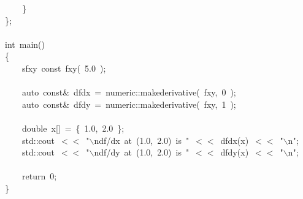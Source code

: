 \documentclass[9pt,onside,a4paper]{article}
\newcommand{\hlstd}[1]{\textcolor[rgb]{0.2,0,0.4}{#1}}
\newcommand{\hlnum}[1]{\textcolor[rgb]{0.2,0.73,0.02}{#1}}
\newcommand{\hlesc}[1]{\textcolor[rgb]{0.65,0.09,0.38}{#1}}
\newcommand{\hlstr}[1]{\textcolor[rgb]{0.09,0.38,0.65}{#1}}
\newcommand{\hlopt}[1]{\textcolor[rgb]{0.33,0.33,0.33}{#1}}
\newcommand{\hlkwa}[1]{\textcolor[rgb]{1,0.19,0.19}{#1}}
\newcommand{\hlkwb}[1]{\textcolor[rgb]{0.96,0.55,0.14}{#1}}
\newcommand{\hlkwc}[1]{\textcolor[rgb]{0,0,1}{#1}}
\newcommand{\hlkwd}[1]{\textcolor[rgb]{0.82,0.11,0.93}{#1}}
\begin{document}
{\hlstd{}\hlstd{\ \ \ \ }\hlstd{}\hlopt{\}}\hspace*{\fill}\\
\hlstd{}\hlopt{\};}\hspace*{\fill}\\
\hlstd{}\hspace*{\fill}\\
\hlkwb{int\ }\hlstd{}\hlkwd{main}\hlstd{}\hlopt{()}\hspace*{\fill}\\
\hlstd{}\hlopt{\{}\hspace*{\fill}\\
\hlstd{}\hlstd{\ \ \ \ }\hlstd{sfxy\ }\hlkwb{const\ }\hlstd{}\hlkwd{fxy}\hlstd{}\hlopt{(\ }\hlstd{}\hlnum{5.0\ }\hlstd{}\hlopt{);}\hspace*{\fill}\\
\hlstd{\hspace*{\fill}\\
}\hlstd{\ \ \ \ }\hlstd{}\hlkwc{auto\ }\hlstd{}\hlkwb{const}\hlstd{}\hlopt{\&\ }\hlstd{dfdx\ }\hlopt{=\ }\hlstd{numeric}\hlopt{::}\hlstd{}\hlkwd{make\textunderscore derivative}\hlstd{}\hlopt{(\ }\hlstd{fxy}\hlopt{,\ }\hlstd{}\hlnum{0\ }\hlstd{}\hlopt{);}\hspace*{\fill}\\
\hlstd{}\hlstd{\ \ \ \ }\hlstd{}\hlkwc{auto\ }\hlstd{}\hlkwb{const}\hlstd{}\hlopt{\&\ }\hlstd{dfdy\ }\hlopt{=\ }\hlstd{numeric}\hlopt{::}\hlstd{}\hlkwd{make\textunderscore derivative}\hlstd{}\hlopt{(\ }\hlstd{fxy}\hlopt{,\ }\hlstd{}\hlnum{1\ }\hlstd{}\hlopt{);}\hspace*{\fill}\\
\hlstd{\hspace*{\fill}\\
}\hlstd{\ \ \ \ }\hlstd{}\hlkwb{double\ }\hlstd{x}\hlopt{{[}{]}\ =\ \{\ }\hlstd{}\hlnum{1.0}\hlstd{}\hlopt{,\ }\hlstd{}\hlnum{2.0\ }\hlstd{}\hlopt{\};}\hspace*{\fill}\\
\hlstd{}\hlstd{\ \ \ \ }\hlstd{std}\hlopt{::}\hlstd{cout\ }\hlopt{$<$$<$\ }\hlstd{}\hlstr{"}\hlesc{$\backslash$n}\hlstr{df/dx\ at\ (1.0,\ 2.0)\ is\ "}\hlstd{\ }\hlopt{$<$$<$\ }\hlstd{}\hlkwd{dfdx}\hlstd{}\hlopt{(}\hlstd{x}\hlopt{)\ $<$$<$\ }\hlstd{}\hlstr{"}\hlesc{$\backslash$n}\hlstr{"}\hlstd{}\hlopt{;}\hspace*{\fill}\\
\hlstd{}\hlstd{\ \ \ \ }\hlstd{std}\hlopt{::}\hlstd{cout\ }\hlopt{$<$$<$\ }\hlstd{}\hlstr{"}\hlesc{$\backslash$n}\hlstr{df/dy\ at\ (1.0,\ 2.0)\ is\ "}\hlstd{\ }\hlopt{$<$$<$\ }\hlstd{}\hlkwd{dfdy}\hlstd{}\hlopt{(}\hlstd{x}\hlopt{)\ $<$$<$\ }\hlstd{}\hlstr{"}\hlesc{$\backslash$n}\hlstr{"}\hlstd{}\hlopt{;}\hspace*{\fill}\\
\hlstd{\hspace*{\fill}\\
}\hlstd{\ \ \ \ }\hlstd{}\hlkwa{return\ }\hlstd{}\hlnum{0}\hlstd{}\hlopt{;}\hspace*{\fill}\\
\hlstd{}\hlopt{\}}\hspace*{\fill}\\
\hlstd{}\hspace*{\fill}\\
\mbox{}
}
\end{document}
